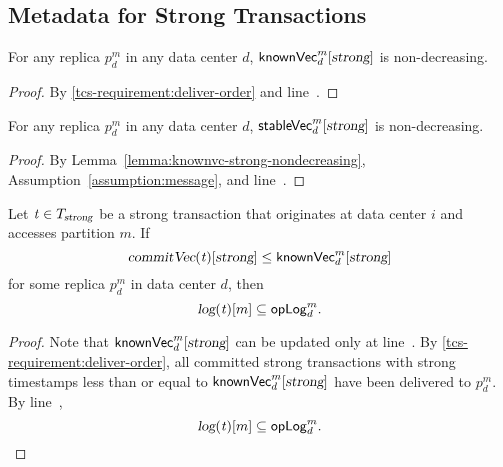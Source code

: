 
\subsection{Metadata for Strong Transactions} \label{ss:metadata-strong}

\begin{applemma} \label{lemma:knownvc-strong-nondecreasing}
  For any replica $p^{m}_{d}$ in any data center $d$,
  ${\sf knownVec}^{m}_{d}[\textsl{strong}]$ is non-decreasing.
\end{applemma}

\begin{proof} \label{proof:knownvc-strong-nondecreasing}
  By \ref{tcs-requirement:deliver-order}
  and line~\code{\ref{alg:unistore-strong-commit}}{\ref{line:deliverupdates-foreach-wbuff}}.
\end{proof}

\begin{applemma} \label{lemma:stablevc-strong-nondecreasing}
  For any replica $p^{m}_{d}$ in any data center $d$,
  ${\sf stableVec}^{m}_{d}[\textsl{strong}]$ is non-decreasing.
\end{applemma}

\begin{proof} \label{proof:stablevc-strong-nondecreasing}
  By Lemma~\ref{lemma:knownvc-strong-nondecreasing},
  Assumption~\ref{assumption:message},
  and line~\code{\ref{alg:unistore-clock}}{\ref{line:knownvclocal-stablevc-strong}}.
\end{proof}

\begin{applemma}[\prop{6}] \label{lemma:knownvc-strong}
  Let $\mathit{t} \in T_{\textsl{strong}}$ be a strong transaction
  that originates at data center $i$
  and accesses partition $m$.
  If
  \[
    \textsl{commitVec}(\mathit{t})[\textsl{strong}] \le {\sf knownVec}^{m}_{d}[\textsl{strong}]
  \]
  for some replica $p^{m}_{d}$ in data center $d$,
  then
  \[
    \textsl{log}(\mathit{t})[m] \subseteq {\sf opLog}^{m}_{d}.
  \]
\end{applemma}

\begin{proof} \label{proof:knownvc-strong}
  Note that ${\sf knownVec}^{m}_{d}[\textsl{strong}]$ can be updated
  only at line~\code{\ref{alg:unistore-strong-commit}}{\ref{line:deliverupdates-knownvc-strongentry}}.
  By \ref{tcs-requirement:deliver-order},
  all committed strong transactions with strong timestamps
  less than or equal to ${\sf knownVec}^{m}_{d}[\textsl{strong}]$
  have been delivered to $p^{m}_{d}$.
  By line~\code{\ref{alg:unistore-strong-commit}}{\ref{line:deliverupdates-oplog}},
  \[
    \textsl{log}(\mathit{t})[m] \subseteq {\sf opLog}^{m}_{d}.
  \]
\end{proof}
